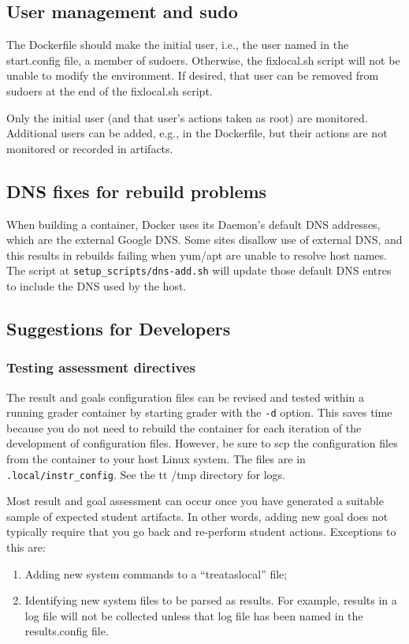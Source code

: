 \documentclass[12pt]{article}
\begin{document}
\subsection{User management and sudo}
The Dockerfile should make the initial user, i.e., the user named in the start.config file, a member of sudoers.
Otherwise, the fixlocal.sh script will not be unable to modify the environment.  If desired, that user can be
removed from sudoers at the end of the fixlocal.sh script.

Only the initial user (and that user's actions taken as root) are monitored.  Additional users can be added,
e.g., in the Dockerfile, but their actions are not monitored or recorded in artifacts.

\subsection{DNS fixes for rebuild problems}
\label{DNS-rebuild}
When building a container, Docker uses its Daemon's default DNS addresses, which are the external Google DNS.
Some sites disallow use of external DNS, and this results in rebuilds failing when yum/apt are unable to resolve 
host names.  The script at {\tt setup\_scripts/dns-add.sh} will update those default DNS entres to include the
DNS used by the host.

\subsection{Suggestions for Developers}
\label{suggestions}
\subsubsection{Testing assessment directives}
The result and goals configuration files can be revised and tested within a
running grader container by starting grader with the {\tt -d} option.  This saves time because you do not need to rebuild
the container for each iteration of the development of configuration files.  However,
be sure to scp the configuration files from the container to your host Linux system.  The files are in
{\tt .local/instr\_config}.  See the {tt /tmp} directory for logs.

Most result and goal assessment can occur once you have generated a suitable sample of
expected student artifacts.  In other words, adding new goal does not typically require
that you go back and re-perform student actions.  Exceptions to this are:

\begin{enumerate}
\item Adding new system commands to a ``treataslocal'' file;
\item Identifying new system files to be parsed as results.  For example, results in a log
file will not be collected unless that log file has been named in the results.config file.
\end{enumerate}
\end{document}
